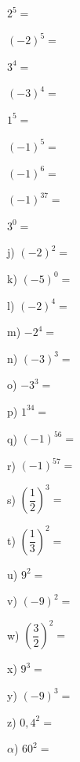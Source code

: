 \documentclass[a4paper,12pt]{article}
\begin{document}
\begin{enumerate}[label=\alph*)]
    \begin{minipage}[t]{0.3\textwidth}
        \item $2^{5} =$
        \item $(-2)^{5} =$
        \item $3^{4} =$
        \item $(-3)^{4} =$
        \item $1^{5} =$
        \item $(-1)^{5} =$
        \item $(-1)^{6} =$
        \item $(-1)^{37} =$
        \item $3^{0} =$
    \end{minipage}
    \begin{minipage}[t]{0.3\textwidth}
        \item[j)] $(-2)^{2} =$
        \item[k)] $(-5)^{0} =$
        \item[l)] $(-2)^{4} =$
        \item[m)] $-2^{4} =$
        \item[n)] $(-3)^{3} =$
        \item[o)] $-3^{3} =$
        \item[p)] $1^{34} =$
        \item[q)] $(-1)^{56} =$
        \item[r)] $(-1)^{57} =$
    \end{minipage}
    \begin{minipage}[t]{0.3\textwidth}
        \item[s)] $\left(\dfrac{1}{2}\right)^{3} =$
        \item[t)] $\left(\dfrac{1}{3}\right)^{2} =$
        \item[u)] $9^{2} =$
        \item[v)] $(-9)^{2} =$
        \item[w)] $\left(\dfrac{3}{2}\right)^{2} =$
        \item[x)] $9^{3} =$
        \item[y)] $(-9)^{3} =$
        \item[z)] $0{,}4^{2} =$
        \item[$\alpha$)] $60^{2} =$
    \end{minipage}
\end{enumerate}

\vspace{0.8cm}
\end{document}
